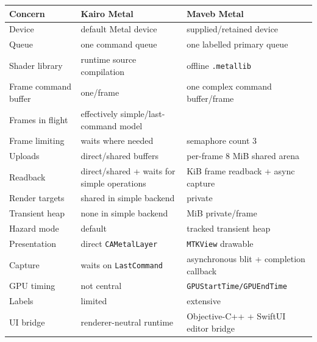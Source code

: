 {\def\LTcaptype{none} %
\begin{longtable}[]{@{}
  >{\raggedright\arraybackslash}p{}
  >{\raggedright\arraybackslash}p{}
  >{\raggedright\arraybackslash}p{}@{}}
\toprule\noalign{}
\begin{minipage}[b]{\linewidth}\raggedright
Concern
\end{minipage} & \begin{minipage}[b]{\linewidth}\raggedright
Kairo Metal
\end{minipage} & \begin{minipage}[b]{\linewidth}\raggedright
Maveb Metal
\end{minipage} \\
\midrule\noalign{}
\endhead
\bottomrule\noalign{}
\endlastfoot
Device & default Metal device & supplied/retained device \\
Queue & one command queue & one labelled primary queue \\
Shader library & runtime source compilation & offline \texttt{.metallib} \\
Frame command buffer & one/frame & one complex command buffer/frame \\
Frames in flight & effectively simple/last-command model & 3 \\
Frame limiting & waits where needed & semaphore count 3 \\
Uploads & direct/shared buffers & per-frame 8 MiB shared arena \\
Readback & direct/shared + waits for simple operations & 256 KiB frame readback + async capture \\
Render targets & shared in simple backend & private \\
Transient heap & none in simple backend & 64 MiB private/frame \\
Hazard mode & default & tracked transient heap \\
Presentation & direct \texttt{CAMetalLayer} & \texttt{MTKView} drawable \\
Capture & waits on \texttt{LastCommand} & asynchronous blit + completion callback \\
GPU timing & not central & \texttt{GPUStartTime/GPUEndTime} \\
Labels & limited & extensive \\
UI bridge & renderer-neutral runtime & Objective-C++ + SwiftUI editor bridge \\
\end{longtable}
}

